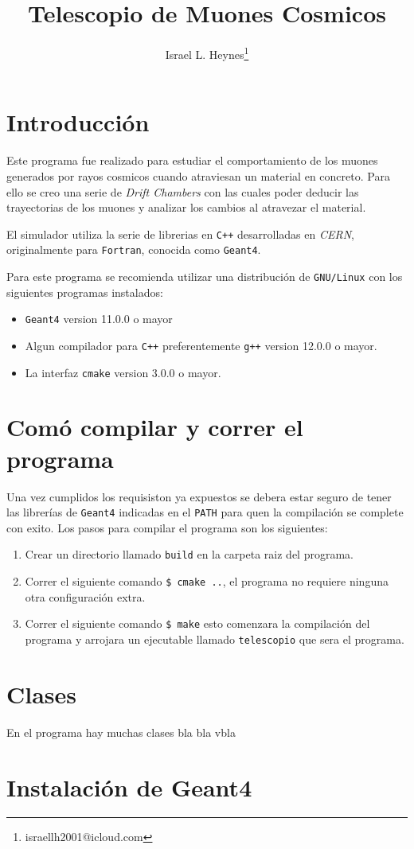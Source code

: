\documentclass[a4paper,10pt]{article}
\author{Israel L. Heynes\thanks{israellh2001@icloud.com}}
\title{Telescopio de Muones Cosmicos}
\begin{document}
    \maketitle
    \tableofcontents

    \section{Introducción}
        Este programa fue realizado para estudiar el comportamiento de los muones generados por rayos cosmicos cuando atraviesan un material en concreto. Para ello se creo una serie de \emph{Drift Chambers} con las cuales poder deducir las trayectorias de los muones y analizar los cambios al atravezar el material.

	El simulador utiliza la serie de librerias en \verb|C++| desarrolladas en \emph{CERN}, originalmente para \verb|Fortran|, conocida como \verb|Geant4|.

	Para este programa se recomienda utilizar una distribución de \verb|GNU/Linux| con los siguientes programas instalados:

	\begin{itemize}
		\item \verb|Geant4| version 11.0.0 o mayor
		\item Algun compilador para \verb|C++| preferentemente \verb|g++| version 12.0.0 o mayor.
		\item La interfaz \verb|cmake| version 3.0.0 o mayor.
	\end{itemize}

    \section{Comó compilar y correr el programa}
    	Una vez cumplidos los requisiston ya expuestos se debera estar seguro de tener las librerías de \verb|Geant4| indicadas en el \verb|PATH| para quen la compilación se complete con exito. Los pasos para compilar el programa son los siguientes:

	\begin{enumerate}
		\item Crear un directorio llamado \verb|build| en la carpeta raiz del programa.
		\item Correr el siguiente comando \verb|$ cmake ..|, el programa no requiere ninguna otra configuración extra.
		\item Correr el siguiente comando \verb|$ make| esto comenzara la compilación del programa y arrojara un ejecutable llamado \verb|telescopio| que sera el programa.
	\end{enumerate}

    \section{Clases}
        En el programa hay muchas clases bla bla vbla

    \appendix
        \section{Instalación de Geant4}
\end{document}
